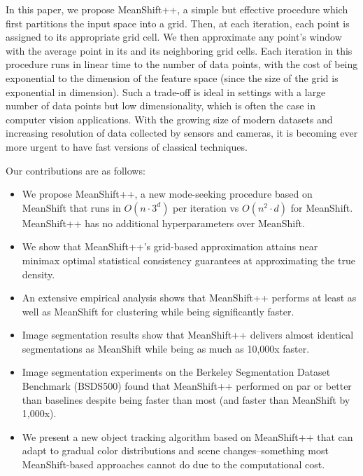 In this paper, we propose MeanShift++, a simple but effective procedure which first partitions the input space into a grid. Then, at each iteration, each point is assigned to its appropriate grid cell. We then approximate any point's window with the average point in its and its neighboring grid cells. Each iteration in this procedure runs in linear time to the number of data points, with the cost of being exponential to the dimension of the feature space (since the size of the grid is exponential in dimension). Such a trade-off is ideal in settings with a large number of data points but low dimensionality, which is often the case in computer vision applications. With the growing size of modern datasets and increasing resolution of data collected by sensors and cameras, it is becoming ever more urgent to have fast versions of classical techniques.

Our contributions are as follows:
\begin{itemize}
    \item We propose MeanShift++, a new mode-seeking procedure based on MeanShift that runs in $O(n\cdot 3^d)$ per iteration vs $O(n^2\cdot d)$ for MeanShift. MeanShift++ has no additional hyperparameters over MeanShift.
    \item We show that MeanShift++'s grid-based approximation attains near minimax optimal statistical consistency guarantees at approximating the true density.
    \item An extensive empirical analysis shows that MeanShift++ performs at least as well as MeanShift for clustering while being significantly faster.
    \item Image segmentation results show that MeanShift++ delivers almost identical segmentations as MeanShift while being as much as 10,000x faster. 
    \item Image segmentation experiments on the Berkeley Segmentation Dataset Benchmark (BSDS500) found that MeanShift++ performed on par or better than baselines despite being faster than most (and faster than MeanShift by 1,000x).
    \item We present a new object tracking algorithm based on MeanShift++ that can adapt to gradual color distributions and scene changes--something most MeanShift-based approaches cannot do due to the computational cost.
\end{itemize}

